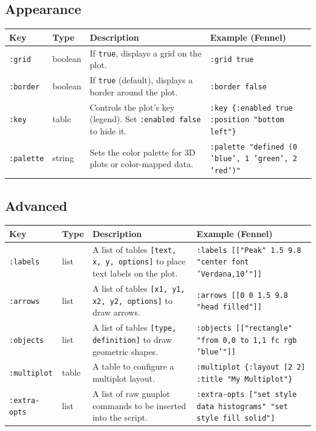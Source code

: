 \documentclass[12pt, letterpaper]{article}
\begin{document}
	\subsection{Appearance}
	
	\begin{table}[htbp]
		\centering
		\begin{tabularx}{\textwidth}{l l X X}
			\toprule
			\textbf{Key} & \textbf{Type} & \textbf{Description} & \textbf{Example (Fennel)} \\
			\midrule
			\texttt{:grid} & boolean & If \texttt{true}, displays a grid on the plot. & \texttt{:grid true} \\
			\texttt{:border} & boolean & If \texttt{true} (default), displays a border around the plot. & \texttt{:border false} \\
			\texttt{:key} & table & Controls the plot's key (legend). Set \texttt{:enabled false} to hide it. & \texttt{:key \{:enabled true :position "bottom left"\}} \\
			\texttt{:palette} & string & Sets the color palette for 3D plots or color-mapped data. & \texttt{:palette "defined (0 'blue', 1 'green', 2 'red')"} \\
			\bottomrule
		\end{tabularx}
	\end{table}
	
	\subsection{Advanced}
	
	\begin{table}[htbp]
		\centering
		\begin{tabularx}{\textwidth}{l l X X}
			\toprule
			\textbf{Key} & \textbf{Type} & \textbf{Description} & \textbf{Example (Fennel)} \\
			\midrule
			\texttt{:labels} & list & A list of tables \texttt{[text, x, y, options]} to place text labels on the plot. & \texttt{:labels [["Peak" 1.5 9.8 "center font 'Verdana,10'"]]} \\
			\texttt{:arrows} & list & A list of tables \texttt{[x1, y1, x2, y2, options]} to draw arrows. & \texttt{:arrows [[0 0 1.5 9.8 "head filled"]]} \\
			\texttt{:objects} & list & A list of tables \texttt{[type, definition]} to draw geometric shapes. & \texttt{:objects [["rectangle" "from 0,0 to 1,1 fc rgb 'blue'"]]} \\
			\texttt{:multiplot} & table & A table to configure a multiplot layout. & \texttt{:multiplot \{:layout [2 2] :title "My Multiplot"\}} \\
			\texttt{:extra-opts} & list & A list of raw gnuplot commands to be inserted into the script. & \texttt{:extra-opts ["set style data histograms" "set style fill solid"]} \\
			\bottomrule
		\end{tabularx}
	\end{table}
	
\end{document}
